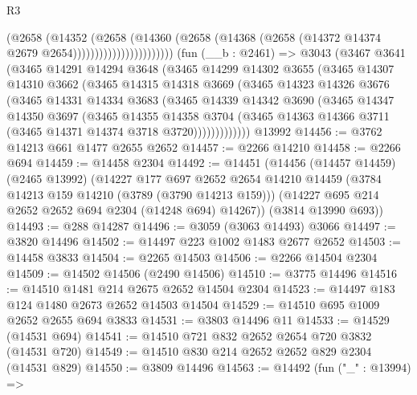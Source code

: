 \begin{lexlean}{R3}
\begin{coremodule}
                                  (@2658
                                    (@14352
                                      (@2658
                                        (@14360
                                          (@2658
                                            (@14368
                                              (@2658
                                                (@14372 @14374 @2679 @2654)))))))))))))))))))))))
    (fun (__b : @2461) =>
    @3043
      (@3467
        @3641
        (@3465
          @14291
          @14294
          @3648
          (@3465
            @14299
            @14302
            @3655
            (@3465
              @14307
              @14310
              @3662
              (@3465
                @14315
                @14318
                @3669
                (@3465
                  @14323
                  @14326
                  @3676
                  (@3465
                    @14331
                    @14334
                    @3683
                    (@3465
                      @14339
                      @14342
                      @3690
                      (@3465
                        @14347
                        @14350
                        @3697
                        (@3465
                          @14355
                          @14358
                          @3704
                          (@3465 @14363 @14366 @3711 (@3465 @14371 @14374 @3718 @3720)))))))))))))
    @13992
@14456 := @3762 @14213 @661 @1477 @2655 @2652
@14457 := @2266 @14210
@14458 := @2266 @694
@14459 := @14458 @2304
@14492 := @14451
    (@14456
      (@14457 @14459)
      (@2465 @13992)
      (@14227
        @177
        @697
        @2652
        @2654
        @14210
        @14459
        (@3784 @14213 @159 @14210 (@3789 (@3790 @14213 @159)))
        (@14227 @695 @214 @2652 @2652 @694 @2304 (@14248 @694) @14267))
      (@3814 @13990 @693))
@14493 := @288 @14287
@14496 := @3059 (@3063 @14493) @3066
@14497 := @3820 @14496
@14502 := @14497 @223 @1002 @1483 @2677 @2652
@14503 := @14458 @3833
@14504 := @2265 @14503
@14506 := @2266 @14504 @2304
@14509 := @14502 @14506 (@2490 @14506)
@14510 := @3775 @14496
@14516 := @14510 @1481 @214 @2675 @2652 @14504 @2304
@14523 := @14497 @183 @124 @1480 @2673 @2652 @14503 @14504
@14529 := @14510 @695 @1009 @2652 @2655 @694 @3833
@14531 := @3803 @14496 @11
@14533 := @14529 (@14531 @694)
@14541 := @14510 @721 @832 @2652 @2654 @720 @3832 (@14531 @720)
@14549 := @14510 @830 @214 @2652 @2652 @829 @2304 (@14531 @829)
@14550 := @3809 @14496
@14563 := @14492
    (fun ("_" : @13994) =>

\end{coremodule}
\end{lexlean}
